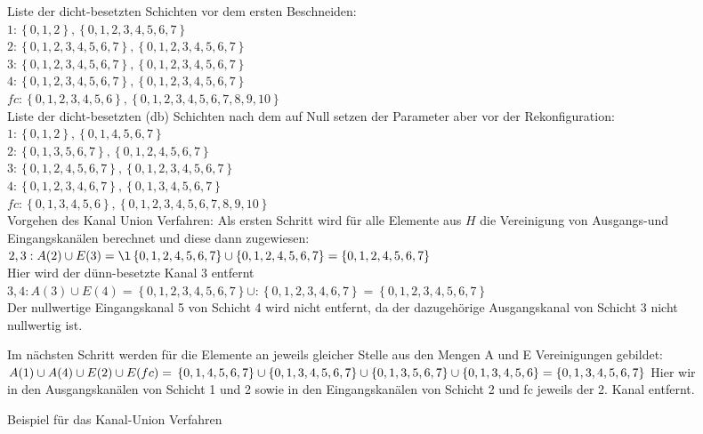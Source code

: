 \begin{figure}[htbp]
{\begin{minipage}[t]{0.65\textwidth}
Liste der dicht-besetzten Schichten vor dem ersten Beschneiden:\\
$1:\left\{0,1,2\right\},\left\{0,1,2,3,4,5,6,7\right\}$\\ 
$2:\left\{0,1,2,3,4,5,6,7\right\},\left\{0,1,2,3,4,5,6,7\right\}$\\
$3:\left\{0,1,2,3,4,5,6,7\right\},\left\{0,1,2,3,4,5,6,7\right\}$\\
$4:\left\{0,1,2,3,4,5,6,7\right\},\left\{0,1,2,3,4,5,6,7\right\}$\\
$fc:\left\{0,1,2,3,4,5,6\right\},\left\{0,1,2,3,4,5,6,7,8,9,10\right\}$\\

Liste der dicht-besetzten (db) Schichten nach dem auf Null setzen der Parameter aber vor der Rekonfiguration:\\
$1:\left\{0,1,2\right\},\left\{0,1,4,5,6,7\right\}$\\ 
$2:\left\{0,1,3,5,6,7\right\},\left\{0,1,2,4,5,6,7\right\}$\\
$3:\left\{0,1,2,4,5,6,7\right\},\left\{0,1,2,3,4,5,6,7\right\}$\\
$4:\left\{0,1,2,3,4,6,7\right\},\left\{0,1,3,4,5,6,7\right\}$\\
$fc:\left\{0,1,3,4,5,6\right\},\left\{0,1,2,3,4,5,6,7,8,9,10\right\}$\\

Vorgehen des Kanal Union Verfahren:
Als ersten Schritt wird für alle Elemente aus $H$ die Vereinigung von Ausgangs-und Eingangskanälen berechnet und diese dann zugewiesen:\\
$2,3:A(2) \cup E(3)= \l\left\{0,1,2,4,5,6,7\right\} \cup \left\{0,1,2,4,5,6,7\right\} =\left\{0,1,2,4,5,6,7\right\} $\\ Hier wird der dünn-besetzte Kanal 3 entfernt\\
$3,4: A(3) \cup E(4) =
\left\{0,1,2,3,4,5,6,7\right\} \cup :\left\{0,1,2,3,4,6,7\right\} = \left\{0,1,2,3,4,5,6,7\right\}$\\
Der nullwertige Eingangskanal 5 von Schicht 4 wird nicht entfernt, da der dazugehörige Ausgangskanal von Schicht 3 nicht nullwertig ist.

Im nächsten Schritt werden für die Elemente an jeweils gleicher Stelle aus den Mengen A und E Vereinigungen gebildet:\\
$A(1)\cup A(4) \cup E(2) \cup E(fc)=\\
\left\{0,1,4,5,6,7\right\} \cup \left\{0,1,3,4,5,6,7\right\} \cup \left\{0,1,3,5,6,7\right\} \cup \left\{0,1,3,4,5,6\right\} = \left\{ 0,1,3,4,5,6,7\right\}$
Hier wir in den Ausgangskanälen von Schicht 1 und 2 sowie in den Eingangskanälen von Schicht 2 und fc jeweils der 2. Kanal entfernt.

\end{minipage}
}
\caption{Beispiel für das Kanal-Union Verfahren}

\end{figure}
\color{black}




